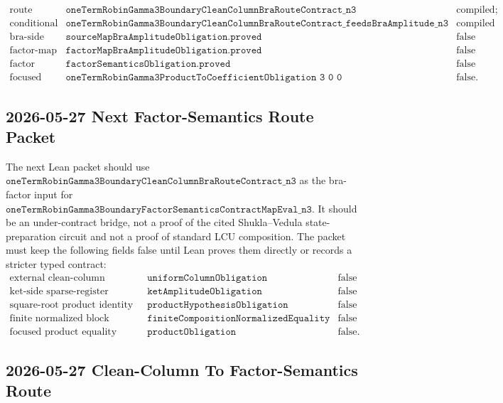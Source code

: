 \[
\begin{array}{lll}
\text{route contract} &
\texttt{oneTermRobinGamma3BoundaryCleanColumnBraRouteContract\_n3} &
\text{compiled; semantic fields false}\\
\text{conditional bra-factor theorem} &
\texttt{oneTermRobinGamma3BoundaryCleanColumnBraRouteContract\_feedsBraAmplitude\_n3} &
\text{compiled under external clean-column hypothesis}\\
\text{bra-side source map} &
\texttt{sourceMapBraAmplitudeObligation.proved} & \text{false}\\
\text{factor-map bra field} &
\texttt{factorMapBraAmplitudeObligation.proved} & \text{false}\\
\text{factor semantics} &
\texttt{factorSemanticsObligation.proved} & \text{false}\\
\text{focused product theorem} &
\texttt{oneTermRobinGamma3ProductToCoefficientObligation\ 3\ 0\ 0} &
\text{false}.
\end{array}
\]

\subsection{2026-05-27 Next Factor-Semantics Route Packet}

The next Lean packet should use
\(\texttt{oneTermRobinGamma3BoundaryCleanColumnBraRouteContract\_n3}\) as the
bra-factor input for
\(\texttt{oneTermRobinGamma3BoundaryFactorSemanticsContractMapEval\_n3}\).
It should be an under-contract bridge, not a proof of the cited
Shukla--Vedula state-preparation circuit and not a proof of standard LCU
composition.  The packet must keep the following fields false until Lean
proves them directly or records a stricter typed contract:
\[
\begin{array}{lll}
\text{external clean-column amplitude} & \texttt{uniformColumnObligation} & \text{false}\\
\text{ket-side sparse-register amplitude} & \texttt{ketAmplitudeObligation} & \text{false}\\
\text{square-root product identity} & \texttt{productHypothesisObligation} & \text{false}\\
\text{finite normalized block equality} & \texttt{finiteCompositionNormalizedEquality} & \text{false}\\
\text{focused product equality} & \texttt{productObligation} & \text{false}.
\end{array}
\]

\subsection{2026-05-27 Clean-Column To Factor-Semantics Route}

